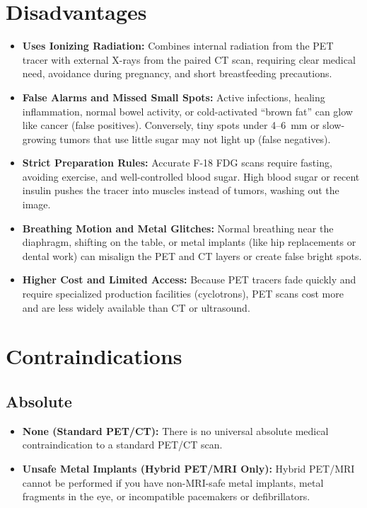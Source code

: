 \section{Disadvantages}

\begin{itemize}
    \item \textbf{Uses Ionizing Radiation:} Combines internal radiation from the PET tracer with external X-rays from the paired CT scan, requiring clear medical need, avoidance during pregnancy, and short breastfeeding precautions.
    \item \textbf{False Alarms and Missed Small Spots:} Active infections, healing inflammation, normal bowel activity, or cold-activated ``brown fat'' can glow like cancer (false positives). Conversely, tiny spots under 4--6~mm or slow-growing tumors that use little sugar may not light up (false negatives).
    \item \textbf{Strict Preparation Rules:} Accurate F-18 FDG scans require fasting, avoiding exercise, and well-controlled blood sugar. High blood sugar or recent insulin pushes the tracer into muscles instead of tumors, washing out the image.
    \item \textbf{Breathing Motion and Metal Glitches:} Normal breathing near the diaphragm, shifting on the table, or metal implants (like hip replacements or dental work) can misalign the PET and CT layers or create false bright spots.
    \item \textbf{Higher Cost and Limited Access:} Because PET tracers fade quickly and require specialized production facilities (cyclotrons), PET scans cost more and are less widely available than CT or ultrasound.
\end{itemize}

\section{Contraindications}

\subsection{Absolute}

\begin{itemize}
    \item \textbf{None (Standard PET/CT):} There is no universal absolute medical contraindication to a standard PET/CT scan.
    \item \textbf{Unsafe Metal Implants (Hybrid PET/MRI Only):} Hybrid PET/MRI cannot be performed if you have non-MRI-safe metal implants, metal fragments in the eye, or incompatible pacemakers or defibrillators.
\end{itemize}

